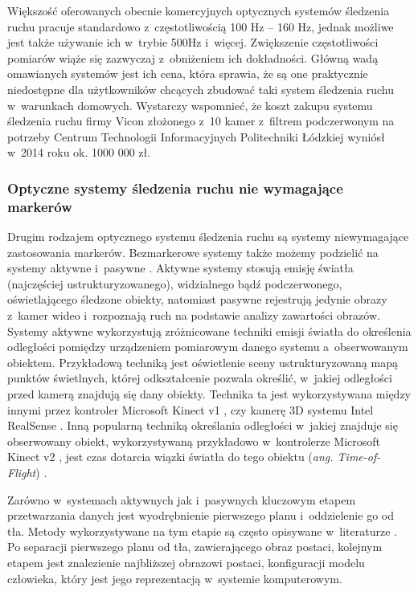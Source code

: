 Większość oferowanych obecnie komercyjnych optycznych systemów śledzenia ruchu pracuje standardowo z~częstotliwością 100 Hz -- 160 Hz, jednak możliwe jest także używanie ich w~trybie 500Hz i~więcej. Zwiększenie częstotliwości pomiarów wiąże się zazwyczaj z~obniżeniem ich dokładności.
Główną wadą omawianych systemów jest ich cena, która sprawia, że są one praktycznie niedostępne dla użytkowników chcących zbudować taki system śledzenia ruchu w~warunkach domowych. Wystarczy wspomnieć, że koszt zakupu systemu śledzenia ruchu firmy Vicon złożonego z~10 kamer z~filtrem podczerwonym na potrzeby Centrum Technologii Informacyjnych Politechniki Łódzkiej  wyniósł w~2014 roku ok. 1000 000 zł.
			 
\subsubsection*{Optyczne systemy śledzenia ruchu nie wymagające markerów}\label{chap:mocaps:Kinect}
Drugim rodzajem optycznego systemu śledzenia ruchu są systemy niewymagające zastosowania markerów. Bezmarkerowe systemy także możemy podzielić na systemy aktywne i~pasywne \cite{Mundermann2006}. Aktywne systemy stosują emisję światła (najczęściej ustrukturyzowanego), widzialnego bądź podczerwonego, oświetlającego śledzone obiekty, natomiast pasywne rejestrują jedynie obrazy z~kamer wideo i~rozpoznają ruch na podstawie analizy zawartości obrazów. \\
Systemy aktywne wykorzystują zróżnicowane techniki emisji światła do określenia odległości pomiędzy urządzeniem pomiarowym danego systemu a~obserwowanym obiektem. Przykładową techniką jest oświetlenie sceny ustrukturyzowaną mapą punktów świetlnych, której odkształcenie pozwala określić, w~jakiej odległości przed kamerą znajdują się dany obiekty. Technika ta jest wykorzystywana między innymi przez kontroler Microsoft Kinect v1 , czy kamerę 3D systemu Intel RealSense . Inną popularną techniką określania odległości w~jakiej znajduje się obserwowany obiekt, wykorzystywaną przykładowo w~kontrolerze Microsoft Kinect v2 , jest czas dotarcia wiązki światła do tego obiektu (\emph{ang. Time-of-Flight}) \cite{Hansard2013}.
			
Zarówno w~systemach aktywnych jak i~pasywnych kluczowym etapem przetwarzania danych jest wyodrębnienie pierwszego planu i~oddzielenie go od tła. Metody wykorzystywane na tym etapie są często opisywane w~literaturze \cite{wang2003recent}\cite{rosenhahn2008markerless}\cite{guan2009estimating}\cite{surer2011markerless}\cite{corazza2006markerless}. Po separacji pierwszego planu od tła, zawierającego obraz postaci, kolejnym etapem jest znalezienie najbliższej obrazowi postaci, konfiguracji modelu człowieka, który jest jego reprezentacją w~systemie komputerowym.\\ 
			
